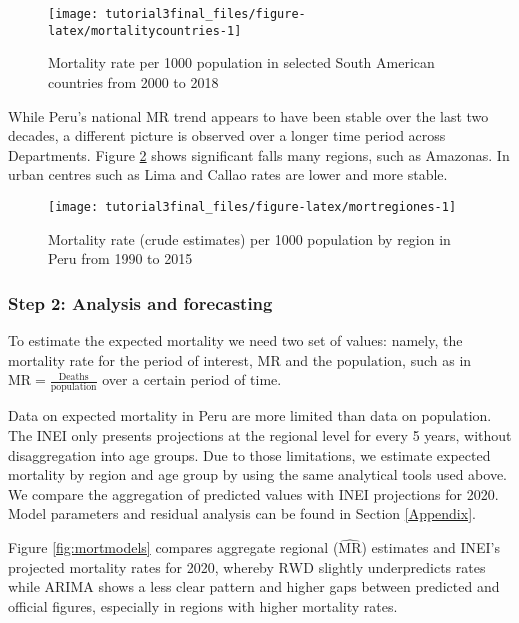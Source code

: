 \documentclass[
]{article}
\begin{document}
\begin{figure}[H]

{\centering \texttt{[image: tutorial3final\_files/figure-latex/mortalitycountries-1]} 

}

\caption{Mortality rate per 1000 population in selected South American countries from 2000 to 2018}\label{fig:mortalitycountries}
\end{figure}

While Peru's national MR trend appears to have been stable over the last two decades, a different picture is observed over a longer time period across Departments. Figure \ref{fig:mortregiones} shows significant falls many regions, such as Amazonas. In urban centres such as Lima and Callao rates are lower and more stable.

\begin{figure}[H]

{\centering \texttt{[image: tutorial3final\_files/figure-latex/mortregiones-1]} 

}

\caption{Mortality rate (crude estimates) per 1000 population by region in Peru from 1990 to 2015}\label{fig:mortregiones}
\end{figure}

\hypertarget{step-2-analysis-and-forecasting-1}{%
\subsubsection{Step 2: Analysis and forecasting}\label{step-2-analysis-and-forecasting-1}}

To estimate the expected mortality we need two set of values: namely, the mortality rate for the period of interest, \(\text{MR}\) and the \(\text{population}\), such as in \(\text{MR} = \frac{\text{Deaths}}{\text{population}}\) over a certain period of time.

Data on expected mortality in Peru are more limited than data on population. The INEI only presents projections at the regional level for every 5 years, without disaggregation into age groups. Due to those limitations, we estimate expected mortality by region and age group by using the same analytical tools used above. We compare the aggregation of predicted values with INEI projections for 2020. Model parameters and residual analysis can be found in Section \ref{Appendix}.

Figure \ref{fig:mortmodels} compares aggregate regional (\(\widehat{\text{MR}}\)) estimates and INEI's projected mortality rates for 2020, whereby \(\text{RWD}\) slightly underpredicts rates while \(\text{ARIMA}\) shows a less clear pattern and higher gaps between predicted and official figures, especially in regions with higher mortality rates.
\end{document}
